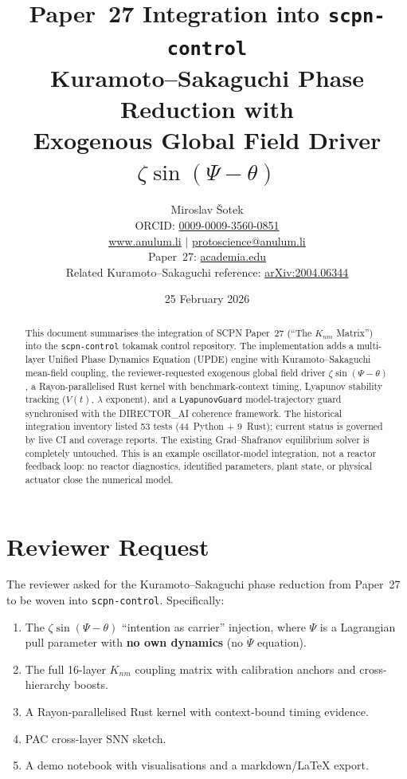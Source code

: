 \documentclass[11pt,a4paper]{article}
\title{Paper~27 Integration into \texttt{scpn-control}\\[4pt]
  \large Kuramoto--Sakaguchi Phase Reduction with\\
  Exogenous Global Field Driver $\zeta\sin(\Psi-\theta)$}
\author{Miroslav \v{S}otek\\
  \small ORCID: \href{https://orcid.org/0009-0009-3560-0851}{0009-0009-3560-0851}\\
  \small\href{https://www.anulum.li}{www.anulum.li} $\mid$
  \href{mailto:protoscience@anulum.li}{protoscience@anulum.li}\\[4pt]
  \small Paper~27: \href{https://www.academia.edu/143833534/27_SCPN_The_Knm_Matrix}{academia.edu}\\
  \small Related Kuramoto--Sakaguchi reference:
  \href{https://arxiv.org/abs/2004.06344}{arXiv:2004.06344}}
\date{25 February 2026}
\begin{document}
\maketitle

\begin{abstract}
This document summarises the integration of SCPN Paper~27
(``The $K_{nm}$ Matrix'') into the \texttt{scpn-control} tokamak control
repository.  The implementation adds a multi-layer Unified Phase Dynamics
Equation (UPDE) engine with Kuramoto--Sakaguchi mean-field coupling,
the reviewer-requested exogenous global field driver
$\zeta\sin(\Psi-\theta)$, a Rayon-parallelised Rust kernel with
benchmark-context timing, Lyapunov stability tracking ($V(t)$, $\lambda$ exponent),
and a \texttt{LyapunovGuard} model-trajectory guard synchronised with the
DIRECTOR\_AI coherence framework. The historical integration inventory listed
53 tests (44~Python + 9~Rust); current status is governed by live CI and
coverage reports. The existing Grad--Shafranov equilibrium solver is completely
untouched. This is an example oscillator-model integration, not a reactor
feedback loop: no reactor diagnostics, identified parameters, plant state, or
physical actuator close the numerical model.
\end{abstract}

\tableofcontents
\newpage

\section{Reviewer Request}

The reviewer asked for the Kuramoto--Sakaguchi phase reduction from
Paper~27~\cite{sotek2026knm} to be woven into \texttt{scpn-control}.
Specifically:

\begin{enumerate}
  \item The $\zeta\sin(\Psi-\theta)$ ``intention as carrier'' injection,
        where $\Psi$ is a Lagrangian pull parameter with \textbf{no own
        dynamics} (no $\dot\Psi$ equation).
  \item The full 16-layer $K_{nm}$ coupling matrix with calibration anchors
        and cross-hierarchy boosts.
  \item A Rayon-parallelised Rust kernel with context-bound timing evidence.
  \item PAC cross-layer SNN sketch.
  \item A demo notebook with visualisations and a markdown/\LaTeX{} export.
\end{enumerate}
\end{document}
